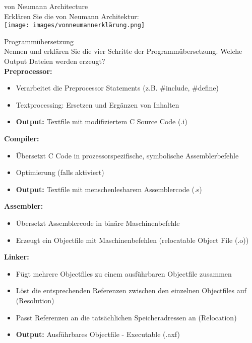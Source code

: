 \begin{example2}{von Neumann Architecture}\\
Erklären Sie die von Neumann Architektur:\\
\texttt{[image: images/vonneumannerklärung.png]}
\end{example2}

\begin{example2}{Programmübersetzung}\\
Nennen und erklären Sie die vier Schritte der Programmübersetzung. Welche Output Dateien werden erzeugt?\\
\textbf{Preprocessor:}
\begin{itemize}
  \item Verarbeitet die Preprocessor Statements (z.B. \#include, \#define)
  \item Textprocessing: Ersetzen und Ergänzen von Inhalten
  \item \textbf{Output:} Textfile mit modifiziertem C Source Code (.i)
\end{itemize}
\textbf{Compiler:}
\begin{itemize}
  \item Übersetzt C Code in prozessorspezifische, symbolische Assemblerbefehle
  \item Optimierung (falls aktiviert)
  \item \textbf{Output:} Textfile mit menschenlesbarem Assemblercode (.s)
\end{itemize}
\textbf{Assembler:}
\begin{itemize}
  \item Übersetzt Assemblercode in binäre Maschinenbefehle
  \item Erzeugt ein Objectfile mit Maschinenbefehlen (relocatable Object File (.o))
\end{itemize}
\textbf{Linker:}
\begin{itemize}
  \item Fügt mehrere Objectfiles zu einem ausführbaren Objectfile zusammen
  \item Löst die entsprechenden Referenzen zwischen den einzelnen Objectfiles auf (Resolution)
  \item Passt Referenzen an die tatsächlichen Speicheradressen an (Relocation)
  \item \textbf{Output:} Ausführbares Objectfile - Executable (.axf)
\end{itemize}
\end{example2}


